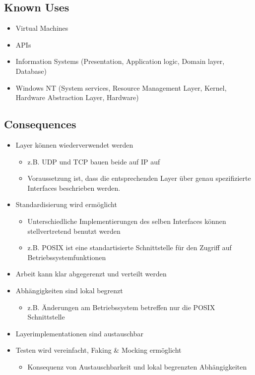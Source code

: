 \subsection*{Known Uses}


\begin{itemize}
	\item Virtual Machines
	\item APIs
	\item Information Systems (Presentation, Application logic, Domain layer, Database)
	\item Windows NT (System services, Resource Management Layer, Kernel, Hardware Abstraction Layer, Hardware)
\end{itemize}

\subsection*{Consequences}


\begin{itemize}
	\item Layer können wiederverwendet werden

	\begin{itemize}
	\item z.B. UDP und TCP bauen beide auf IP auf
	\item Voraussetzung ist, dass die entsprechenden Layer über genau spezifizierte Interfaces beschrieben werden.
	\end{itemize}

	\item Standardisierung wird ermöglicht
	\begin{itemize}
		\item Unterschiedliche Implementierungen des selben Interfaces können stellvertretend benutzt werden
		\item z.B. POSIX ist eine standartisierte Schnittstelle für den Zugriff auf Betriebssystemfunktionen
	\end{itemize}
	\item Arbeit kann klar abgegerenzt und verteilt werden
	\item Abhängigkeiten sind lokal begrenzt
	\begin{itemize}
		\item z.B. Änderungen am Betriebssystem betreffen nur die POSIX Schnittstelle
	\end{itemize}
	\item Layerimplementationen sind austauschbar
	\item Testen wird vereinfacht, Faking \& Mocking ermöglicht
	\begin{itemize}
		\item Konsequenz von Austauschbarkeit und lokal begrenzten Abhängigkeiten
	\end{itemize}
\end{itemize}

